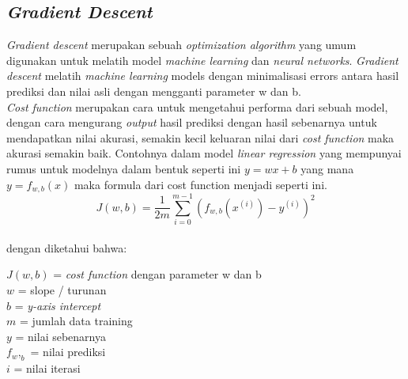 \subsection{\textit{Gradient Descent}} \label{II.Gradient Descent}
\textit{Gradient descent} merupakan sebuah \textit{optimization algorithm} yang umum digunakan untuk melatih model \textit{machine learning} dan \textit{neural networks}\cite{hochreiter2001learning}. \textit{Gradient descent} melatih \textit{machine learning} models dengan minimalisasi errors antara hasil prediksi dan nilai asli dengan mengganti parameter w dan b\cite{hochreiter2001learning}.\\
\textit{Cost function} merupakan cara untuk mengetahui performa dari sebuah model, dengan cara mengurang \textit{output} hasil prediksi dengan hasil sebenarnya untuk mendapatkan nilai akurasi, semakin kecil keluaran nilai dari \textit{cost function} maka akurasi semakin baik\cite{alpaydin2021machine}. Contohnya dalam model \textit{linear regression} yang mempunyai rumus untuk modelnya dalam bentuk seperti ini  $y = wx + b$ yang mana $y = f_{w,b}(x)$ maka formula dari cost function menjadi seperti ini.\\
\begin{equation}
    J(w,b) = \frac{1}{2m} \sum\limits_{i = 0}^{m-1} (f_{w,b}(x^{(i)}) - y^{(i)})^2
\end{equation}
\label{eq:2.CostFunction}
\\
dengan diketahui bahwa:
\begin{center}
$J(w,b)$ = \textit{cost function} dengan parameter w dan b\\
$w$ = slope / turunan\\
$b$ = \textit{y-axis intercept}\\
$m$ = jumlah data training\\
$y$ = nilai sebenarnya\\
$f_w,_b$ = nilai prediksi\\
$i$ = nilai iterasi\\
\end{center}

